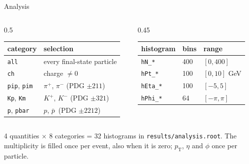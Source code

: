 \documentclass[aspectratio=169,11pt]{beamer}
\newcommand{\pt}{\ensuremath{p_\mathrm{T}}}
\newcommand{\pbar}{\ensuremath{\bar{p}}}
\begin{document}
\begin{frame}{Analysis}
  \begin{columns}[T]
    \begin{column}{0.5\textwidth}
      \small
      \begin{tabular}{ll}
        \toprule
        category & selection \\
        \midrule
        \texttt{all}               & every final-state particle \\
        \texttt{ch}                & charge $\neq 0$ \\
        \texttt{pip}, \texttt{pim} & $\pi^+$, $\pi^-$ (PDG $\pm 211$) \\
        \texttt{Kp}, \texttt{Km}   & $K^+$, $K^-$ (PDG $\pm 321$) \\
        \texttt{p}, \texttt{pbar}  & $p$, \pbar\ (PDG $\pm 2212$) \\
        \bottomrule
      \end{tabular}
    \end{column}
    \begin{column}{0.45\textwidth}
      \small
      \begin{tabular}{lll}
        \toprule
        histogram & bins & range \\
        \midrule
        \texttt{hN\_*}   & 400 & $[0, 400]$ \\
        \texttt{hPt\_*}  & 100 & $[0, 10]$ GeV \\
        \texttt{hEta\_*} & 100 & $[-5, 5]$ \\
        \texttt{hPhi\_*} & 64  & $[-\pi, \pi]$ \\
        \bottomrule
      \end{tabular}
    \end{column}
  \end{columns}

  \vspace{1.5em}
  4 quantities $\times$ 8 categories = 32 histograms in \texttt{results/analysis.root}.
  The multiplicity is filled once per event, also when it is zero; \pt, $\eta$ and $\phi$ once per particle.
\end{frame}
\end{document}
